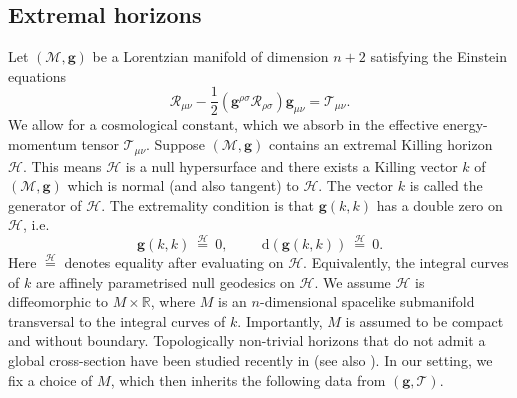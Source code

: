 \documentclass[11pt, reqno]{amsart}
\newcommand{\R}{\mathbb{R}}
\theoremstyle{plain}
\theoremstyle{definition}
\numberwithin{equation}{section}
\begin{document}
\subsection{Extremal horizons} \label{ehors}
Let $(\mathcal{M},\textbf{g})$ be a Lorentzian manifold of dimension $n+2$ satisfying the Einstein equations
\begin{equation} \label{Einstein}
    \mathcal{R}_{\mu\nu} - \frac 12(\textbf{g}^{\rho\sigma}\mathcal{R}_{\rho\sigma})\textbf{g}_{\mu\nu} =\mathcal{T}_{\mu\nu}.
\end{equation}
We allow for a cosmological constant, which we absorb in the effective energy-momentum tensor $\mathcal{T}_{\mu\nu}$. Suppose $(\mathcal{M},\textbf{g})$ contains an extremal Killing horizon $\mathcal{H}$. This means $\mathcal{H}$ is a null hypersurface and there exists a Killing vector $k$ of $(\mathcal{M},\textbf{g})$ which is normal (and also tangent) to $\mathcal{H}$. The vector $k$ is called the generator of $\mathcal{H}$. The extremality condition is that $\textbf{g}(k,k)$ has a double zero on $\mathcal{H}$, i.e.
\begin{equation}
    \textbf{g}(k,k) \:\overset{\mathcal{H}}{=}\:0, \hspace{1cm}\text{d}(\textbf{g}(k,k)) \:\overset{\mathcal{H}}{=} \:0.
\end{equation}
Here $\overset{\mathcal{H}}{=}$ denotes equality after evaluating on $\mathcal{H}$. Equivalently, the integral curves of $k$ are affinely parametrised null geodesics on $\mathcal{H}$. We assume $\mathcal{H}$ is diffeomorphic to $M \times \R$, where $M$ is an $n$-dimensional spacelike submanifold transversal to the integral curves of $k$. Importantly, $M$ is assumed to be compact and without boundary. Topologically non-trivial horizons that do not admit a global cross-section have been studied recently in \cite{BDLO25} (see also \cite{DLO23}). In our setting, we fix a choice of $M$, which then inherits the following data from $(\textbf{g},\mathcal{T})$.
\end{document}
